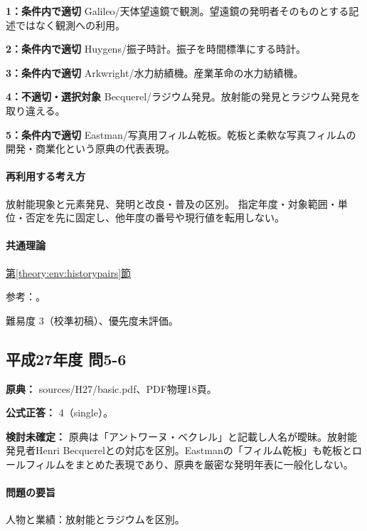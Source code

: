 \noindent\textbf{1：条件内で適切} Galileo/天体望遠鏡で観測。望遠鏡の発明者そのものとする記述ではなく観測への利用。\par

\noindent\textbf{2：条件内で適切} Huygens/振子時計。振子を時間標準にする時計。\par

\noindent\textbf{3：条件内で適切} Arkwright/水力紡績機。産業革命の水力紡績機。\par

\noindent\textbf{4：不適切・選択対象} Becquerel/ラジウム発見。放射能の発見とラジウム発見を取り違える。\par

\noindent\textbf{5：条件内で適切} Eastman/写真用フィルム乾板。乾板と柔軟な写真フィルムの開発・商業化という原典の代表表現。\par

\paragraph{再利用する考え方} 放射能現象と元素発見、発明と改良・普及の区別。 指定年度・対象範囲・単位・否定を先に固定し、他年度の番号や現行値を転用しない。

\paragraph{共通理論} \hyperref[theory:env:historypairs]{第\ref*{theory:env:historypairs}節}

\par 参考：\cite{env58_curie}。

\par 難易度 3（校準初稿）、優先度未評価。

\subsection{平成27年度 問5-6}
\label{q:h27-reg-basic-5-6}

\noindent\textbf{原典：} sources/H27/basic.pdf、PDF物理18頁。

\textbf{公式正答：} 4（single）。

\par\textbf{検討未確定：} 原典は「アントワーヌ・ベクレル」と記載し人名が曖昧。放射能発見者Henri Becquerelとの対応を区別。Eastmanの「フィルム乾板」も乾板とロールフィルムをまとめた表現であり、原典を厳密な発明年表に一般化しない。

\paragraph{問題の要旨} 人物と業績：放射能とラジウムを区別。

